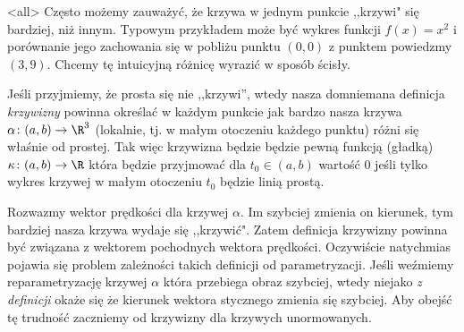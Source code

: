 \mode*
\mode<all>{}
Często możemy zauważyć, że krzywa w jednym punkcie ,,krzywi" się bardziej, niż innym. Typowym przykładem może być wykres funkcji $f(x)=x^2$ i porównanie jego zachowania się w pobliżu punktu $(0,0)$ z punktem powiedzmy $(3,9)$. Chcemy tę intuicyjną różnicę wyrazić w sposób ścisły.

Jeśli przyjmiemy, że prosta się nie ,,krzywi'', wtedy nasza domniemana definicja \textit{krzywizny} powinna określać w każdym punkcie jak bardzo nasza krzywa $\alpha\colon (a,b)\to \R^3$ (lokalnie, tj. w małym otoczeniu każdego punktu) różni się właśnie od prostej. Tak więc krzywizna będzie będzie pewną funkcją (gładką) $\kappa\colon (a,b)\to \R$ która będzie przyjmować dla $t_0\in (a,b)$ wartość $0$ jeśli tylko wykres krzywej w małym otoczeniu $t_0$ będzie linią prostą.

Rozwazmy wektor prędkości dla krzywej $\alpha$. Im szybciej zmienia on kierunek, tym bardziej nasza krzywa wydaje się ,,krzywić". Zatem definicja krzywizny powinna być związana z wektorem pochodnych wektora prędkości. Oczywiście natychmias pojawia się problem zależności takich definicji od parametryzacji. Jeśli weźmiemy reparametryzację krzywej $\alpha$ która przebiega obraz szybciej, wtedy niejako \textit{z definicji} okaże się że kierunek wektora stycznego zmienia się szybciej.
Aby obejść tę trudność zaczniemy od krzywizny dla krzywych unormowanych.

